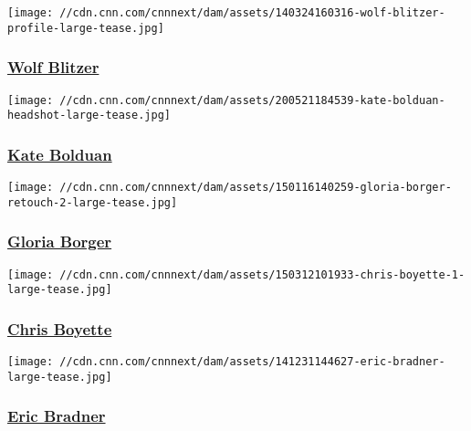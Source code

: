 \href{/profiles/wolf-blitzer-profile}{}

\texttt{[image: //cdn.cnn.com/cnnnext/dam/assets/140324160316-wolf-blitzer-profile-large-tease.jpg]}

\hypertarget{wolf-blitzer}{%
\subsubsection{\texorpdfstring{\href{/profiles/wolf-blitzer-profile}{Wolf
Blitzer}}{Wolf Blitzer}}\label{wolf-blitzer}}

\href{/profiles/kate-bolduan-profile}{}

\texttt{[image: //cdn.cnn.com/cnnnext/dam/assets/200521184539-kate-bolduan-headshot-large-tease.jpg]}

\hypertarget{kate-bolduan}{%
\subsubsection{\texorpdfstring{\href{/profiles/kate-bolduan-profile}{Kate
Bolduan}}{Kate Bolduan}}\label{kate-bolduan}}

\href{/profiles/gloria-borger}{}

\texttt{[image: //cdn.cnn.com/cnnnext/dam/assets/150116140259-gloria-borger-retouch-2-large-tease.jpg]}

\hypertarget{gloria-borger}{%
\subsubsection{\texorpdfstring{\href{/profiles/gloria-borger}{Gloria
Borger}}{Gloria Borger}}\label{gloria-borger}}

\href{/profiles/chris-boyette}{}

\texttt{[image: //cdn.cnn.com/cnnnext/dam/assets/150312101933-chris-boyette-1-large-tease.jpg]}

\hypertarget{chris-boyette}{%
\subsubsection{\texorpdfstring{\href{/profiles/chris-boyette}{Chris
Boyette}}{Chris Boyette}}\label{chris-boyette}}

\href{/profiles/eric-bradner}{}

\texttt{[image: //cdn.cnn.com/cnnnext/dam/assets/141231144627-eric-bradner-large-tease.jpg]}

\hypertarget{eric-bradner}{%
\subsubsection{\texorpdfstring{\href{/profiles/eric-bradner}{Eric
Bradner}}{Eric Bradner}}\label{eric-bradner}}

